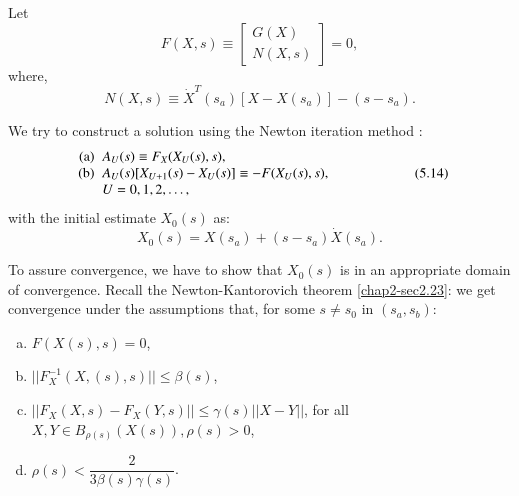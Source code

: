 Let\pageoriginale
\begin{equation*}
F(X,s) \equiv
\begin{bmatrix}
G(X)\\
N(X,s)
\end{bmatrix}
=0,
\end{equation*}
where,
$$
N(X,s) \equiv \dot{X}^T(s_a)[X-X(s_a)]-(s-s_a). 
$$

We try to construct a solution using the Newton iteration method : 
\begin{equation*}
\begin{array}{r@{\;\;}>{$}p{7cm}<{$}}
 \text{\rm(a)} & A_U (s) \equiv F_X(X_U (s),s),\\ 
\text{\rm(b)} & A_U (s) [X_{U +1}(s)- X_U (s)] \equiv -F(X_U (s),s),\newline U =
0,1,2, \ldots,  
\end{array}\tag{5.14}\label{chap5-eq5.14}
\end{equation*}
with the initial estimate $X_0(s)$ as:
$$
X_0(s)=X(s_a)+(s-s_a)\dot{X}(s_a).
$$


To assure convergence, we have to show that $X_0(s)$ is in an
appropriate domain of convergence. Recall the Newton-Kantorovich
theorem  \ref{chap2-sec2.23}: we get convergence under the assumptions
that, for some $s\neq s_0$ in $(s_a,s_b)$:
\begin{enumerate}[(a)]
\item $F(X(s),s)=0$,
\item $|| F^{-1}_X(X,(s), s)|| \le \beta(s)$,
\item $|| F_X(X,s)-F_X(Y,s)|| \le \gamma(s) || X-Y ||$, for all $X,Y
  \in B_{\rho(s)}(X(s)),\rho(s)>0$, 
\item $\rho(s) < \dfrac{2}{3 \beta(s)\gamma(s)}$.
\end{enumerate}

